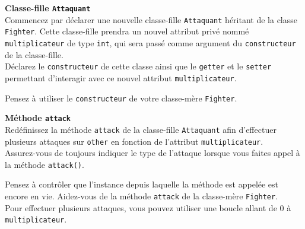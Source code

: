 \begin{Exercice}[5 minutes] \textbf{Classe-fille \lstinline{Attaquant}} \\

Commencez par déclarer une nouvelle classe-fille \lstinline{Attaquant} héritant de la classe \lstinline{Fighter}. Cette classe-fille prendra un nouvel attribut privé nommé \lstinline{multiplicateur} de type \lstinline{int}, qui sera passé comme argument du \lstinline{constructeur} de la classe-fille. \\

Déclarez le \lstinline{constructeur} de cette classe ainsi que le \lstinline{getter} et le \lstinline{setter} permettant d'interagir avec ce nouvel attribut \lstinline{multiplicateur}. \\

\begin{conseil}
Pensez à utiliser le \lstinline{constructeur} de votre classe-mère \lstinline{Fighter}.
\end{conseil}

\begin{solution}
	
\end{solution}

\end{Exercice}

\begin{Exercice}[10 minutes] \textbf{Méthode \lstinline{attack}} \\

Redéfinissez la méthode \lstinline{attack} de la classe-fille \lstinline{Attaquant} afin d'effectuer plusieurs attaques sur \lstinline{other} en fonction de l'attribut \lstinline{multiplicateur}. \\

Assurez-vous de toujours indiquer le type de l'attaque lorsque vous faites appel à la méthode \lstinline{attack()}.

\begin{conseil}
Pensez à contrôler que l'instance depuis laquelle la méthode est appelée est encore en vie.
Aidez-vous de la méthode \lstinline{attack} de la classe-mère \lstinline{Fighter}.\\

Pour effectuer plusieurs attaques, vous pouvez utiliser une boucle allant de 0 à \lstinline{multiplicateur}.

\end{conseil}

\begin{solution}
	
\end{solution}

\end{Exercice}

